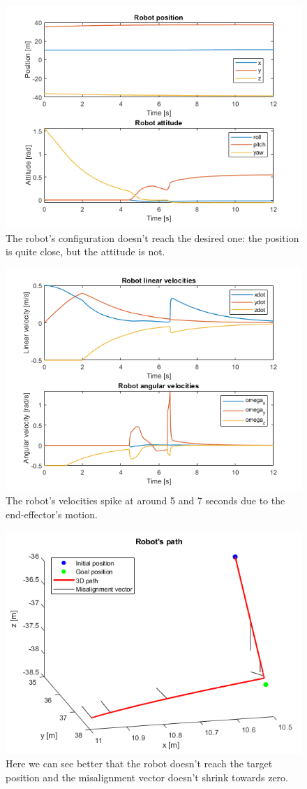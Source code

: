 \documentclass{article}
\begin{document}
\begin{figure}[H]
	\centering
	\includegraphics[width=0.7\linewidth]{images/Ex1/HorAtt_Disabled_Tool_Enabled_PosAndAtt}
	\caption{The robot's configuration doesn't reach the desired one: the position is quite close, but the attitude is not.}
	\label{fig:q4a}
\end{figure}
\begin{figure}[H]
	\centering
	\includegraphics[width=0.7\linewidth]{images/Ex1/HorAtt_Disabled_Tool_Enabled_LinAngVelocities}
	\caption{The robot's velocities spike at around 5 and 7 seconds due to the end-effector's motion.}
	\label{fig:q4b}
\end{figure}
\begin{figure}[H]
	\centering
	\includegraphics[width=0.7\linewidth]{images/Ex1/HorAtt_Disabled_Tool_Enabled_Path}
	\caption{Here we can see better that the robot doesn't reach the target position and the misalignment vector doesn't shrink towards zero.}
	\label{fig:q4c}
\end{figure}
\end{document}
